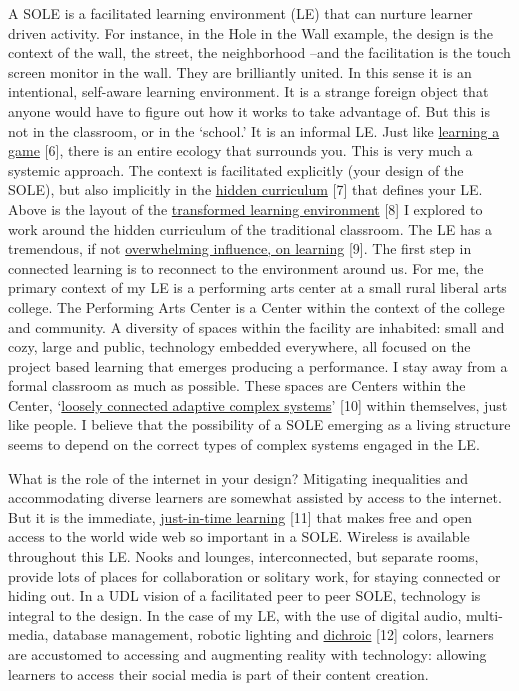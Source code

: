 A SOLE is a facilitated learning environment (LE) that can nurture
learner driven activity. For instance, in the Hole in the Wall example,
the design is the context of the wall, the street, the neighborhood
--and the facilitation is the touch screen monitor in the wall. They are
brilliantly united. In this sense it is an intentional, self-aware
learning environment. It is a strange foreign object that anyone would
have to figure out how it works to take advantage of. But this is not in
the classroom, or in the `school.' It is an informal LE. Just like
\href{http://www.academia.edu/1137269/Game-based_Learning_and_Intrinsic_Motivation}{learning
a game} {{[}6{]}}, there is an entire ecology that surrounds you. This
is very much a systemic approach. The context is facilitated explicitly
(your design of the SOLE), but also implicitly in the
\href{http://en.wikipedia.org/wiki/Hidden_curriculum}{hidden curriculum}
{{[}7{]}} that defines your LE. Above is the layout of the
\href{http://www.scribd.com/doc/181089012/Transformed-Learning-Environment-Analysis}{transformed
learning environment} {{[}8{]}} I explored to work around the hidden
curriculum of the traditional classroom. The LE has a tremendous, if not
\href{http://scholar.lib.vt.edu/theses/available/etd-09232007-220306/unrestricted/SElmasryETDbodytext.pdf}{overwhelming
influence, on learning} {{[}9{]}}. The first step in connected learning
is to reconnect to the environment around us. For me, the primary
context of my LE is a performing arts center at a small rural liberal
arts college. The Performing Arts Center is a Center within the context
of the college and community. A diversity of spaces within the facility
are inhabited: small and cozy, large and public, technology embedded
everywhere, all focused on the project based learning that emerges
producing a performance. I stay away from a formal classroom as much as
possible. These spaces are Centers within the Center,
`\href{http://nourdiab.wordpress.com/2011/02/23/the-theories-of-christopher-alexander/}{loosely
connected adaptive complex systems}' {{[}10{]}} within themselves, just
like people. I believe that the possibility of a SOLE emerging as a
living structure seems to depend on the correct types of complex systems
engaged in the LE.

What is the role of the internet in your design? Mitigating inequalities
and accommodating diverse learners are somewhat assisted by access to
the internet. But it is the immediate,
\href{http://www.wordstream.com/blog/ws/2013/10/02/just-in-time-information-hacks}{just-in-time
learning} {{[}11{]}} that makes free and open access to the world wide
web so important in a SOLE. Wireless is available throughout this LE.
Nooks and lounges, interconnected, but separate rooms, provide lots of
places for collaboration or solitary work, for staying connected or
hiding out. In a UDL vision of a facilitated peer to peer SOLE,
technology is integral to the design. In the case of my LE, with the use
of digital audio, multi-media, database management, robotic lighting and
\href{http://en.wikipedia.org/wiki/Dichroic_filter}{dichroic} {{[}12{]}}
colors, learners are accustomed to accessing and augmenting reality with
technology: allowing learners to access their social media is part of
their content creation.

